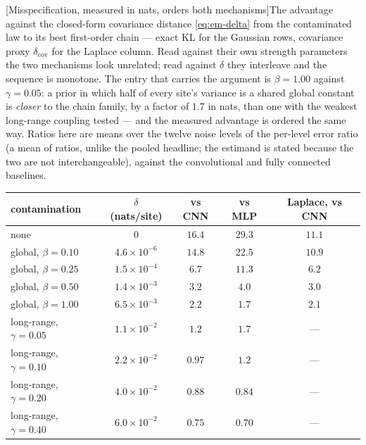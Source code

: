 \begin{center}
\begin{minipage}{\linewidth}\small\centering
{}[Misspecification, measured in nats, orders both
mechanisms]{The advantage against the closed-form covariance distance
\eqref{eq:em-delta}
from the contaminated law to its best first-order chain --- exact KL for the
Gaussian rows, covariance proxy $\delta_{\mathrm{cov}}$ for the Laplace
column. Read against their own
strength parameters the two mechanisms look unrelated; read against $\delta$
they interleave and the sequence is monotone. The entry that carries the
argument is $\beta = 1.00$ against $\gamma = 0.05$: a prior in which half of
every site's variance is a shared global constant is \emph{closer} to the chain
family, by a factor of $1.7$ in nats, than one with the weakest long-range
coupling tested --- and the measured advantage is ordered the same way. Ratios
here are means over the twelve noise levels of the per-level error ratio (a
mean of ratios, unlike the pooled headline; the estimand is stated because the
two are not interchangeable), against the convolutional and fully connected
baselines.}
\label{tab:em-misspecification}
\begin{tabular}{@{}lcccc@{}}
\toprule
contamination & $\delta$ (nats/site) & vs CNN & vs MLP & Laplace, vs CNN \\
\midrule
none                      & $0$                   & $16.4$ & $29.3$ & $11.1$ \\
global, $\beta = 0.10$    & $4.6\times10^{-6}$    & $14.8$ & $22.5$ & $10.9$ \\
global, $\beta = 0.25$    & $1.5\times10^{-4}$    & $6.7$  & $11.3$ & $6.2$  \\
global, $\beta = 0.50$    & $1.4\times10^{-3}$    & $3.2$  & $4.0$  & $3.0$  \\
global, $\beta = 1.00$    & $6.5\times10^{-3}$    & $2.2$  & $1.7$  & $2.1$  \\
long-range, $\gamma = 0.05$ & $1.1\times10^{-2}$  & $1.2$  & $1.7$  & --- \\
long-range, $\gamma = 0.10$ & $2.2\times10^{-2}$  & $\mathbf{0.97}$ & $1.2$ & --- \\
long-range, $\gamma = 0.20$ & $4.0\times10^{-2}$  & $\mathbf{0.88}$ & $\mathbf{0.84}$ & --- \\
long-range, $\gamma = 0.40$ & $6.0\times10^{-2}$  & $\mathbf{0.75}$ & $\mathbf{0.70}$ & --- \\
\bottomrule
\end{tabular}
\end{minipage}
\end{center}

